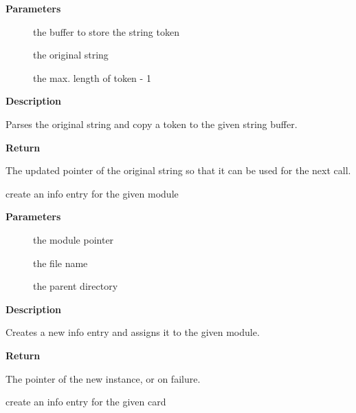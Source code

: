 \documentclass[a4paper,8pt,english]{sphinxmanual}
\begin{document}
\textbf{Parameters}
\begin{description}
\item[{}] \leavevmode
the buffer to store the string token

\item[{}] \leavevmode
the original string

\item[{}] \leavevmode
the max. length of token - 1

\end{description}

\textbf{Description}

Parses the original string and copy a token to the given
string buffer.

\textbf{Return}

The updated pointer of the original string so that
it can be used for the next call.

\begin{fulllineitems}
\label{sound/kernel-api/alsa-driver-api:c.snd_info_create_module_entry}
create an info entry for the given module

\end{fulllineitems}


\textbf{Parameters}
\begin{description}
\item[{}] \leavevmode
the module pointer

\item[{}] \leavevmode
the file name

\item[{}] \leavevmode
the parent directory

\end{description}

\textbf{Description}

Creates a new info entry and assigns it to the given module.

\textbf{Return}

The pointer of the new instance, or  on failure.

\begin{fulllineitems}
\label{sound/kernel-api/alsa-driver-api:c.snd_info_create_card_entry}
create an info entry for the given card

\end{fulllineitems}
\end{document}
